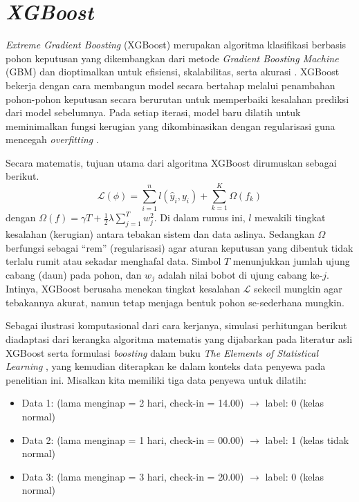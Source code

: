 \section{\it XGBoost}\label{sec:xgboost}

{\it Extreme Gradient Boosting} (XGBoost) merupakan algoritma klasifikasi berbasis pohon keputusan yang dikembangkan dari metode {\it Gradient Boosting Machine} (GBM) dan dioptimalkan untuk efisiensi, skalabilitas, serta akurasi \cite{chen2016xgboost}. XGBoost bekerja dengan cara membangun model secara bertahap melalui penambahan pohon-pohon keputusan secara berurutan untuk memperbaiki kesalahan prediksi dari model sebelumnya. Pada setiap iterasi, model baru dilatih untuk meminimalkan fungsi kerugian yang dikombinasikan dengan regularisasi guna mencegah {\it overfitting} \cite{friedman2001greedy}.

    Secara matematis, tujuan utama dari algoritma XGBoost dirumuskan sebagai berikut.
    $$
    \mathcal{L}(\phi) = \sum_{i=1}^{n} l(\hat{y}_i, y_i) + \sum_{k=1}^{K} \Omega(f_k)
    $$
    dengan $\Omega(f) = \gamma T + \frac{1}{2} \lambda \sum_{j=1}^{T} w_j^2$. Di dalam rumus ini, $l$ mewakili tingkat kesalahan (kerugian) antara tebakan sistem dan data aslinya. Sedangkan $\Omega$ berfungsi sebagai ``rem'' (regularisasi) agar aturan keputusan yang dibentuk tidak terlalu rumit atau sekadar menghafal data. Simbol $T$ menunjukkan jumlah ujung cabang (daun) pada pohon, dan $w_j$ adalah nilai bobot di ujung cabang ke-$j$. Intinya, XGBoost berusaha menekan tingkat kesalahan $\mathcal{L}$ sekecil mungkin agar tebakannya akurat, namun tetap menjaga bentuk pohon se-sederhana mungkin.
    
    Sebagai ilustrasi komputasional dari cara kerjanya, simulasi perhitungan berikut diadaptasi dari kerangka algoritma matematis yang dijabarkan pada literatur asli XGBoost \cite{chen2016xgboost} serta formulasi \textit{boosting} dalam buku \textit{The Elements of Statistical Learning} \cite{hastie2009elements}, yang kemudian diterapkan ke dalam konteks data penyewa pada penelitian ini. Misalkan kita memiliki tiga data penyewa untuk dilatih:
    \begin{itemize}
        \item Data 1: (lama menginap = 2 hari, check-in = 14.00) $\rightarrow$ label: 0 (kelas normal)
        \item Data 2: (lama menginap = 1 hari, check-in = 00.00) $\rightarrow$ label: 1 (kelas tidak normal)
        \item Data 3: (lama menginap = 3 hari, check-in = 20.00) $\rightarrow$ label: 0 (kelas normal)
    \end{itemize}
    
